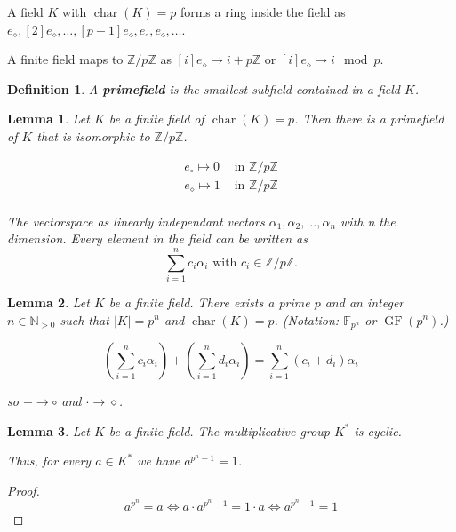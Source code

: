 \documentclass{article}
\newtheorem{definition}{Definition}
\newtheorem{lemma}{Lemma}
\newcommand{\ZZ}{\mathbb{Z}}
\newcommand{\NN}{\mathbb{N}}
\newcommand{\FF}{\mathbb{F}}
\newcommand{\GF}{\operatorname{GF}}
\newcommand{\mchar}{\operatorname{char}}
\begin{document}
A field $K$ with $\mchar(K) = p$ forms a ring inside the field as
$e_\diamond, [2]e_\diamond, \dots, [p-1] e_\diamond, e_\circ, e_\diamond, \dots$.

A finite field maps to $\ZZ/p\ZZ$ as $[i] e_\diamond \mapsto i + p\ZZ$ or $[i]
e_\diamond \mapsto i \mod p$.

\begin{definition}
    A \textbf{primefield} is the smallest subfield contained in a field $K$.
\end{definition}

\begin{lemma}
    Let $K$ be a finite field of $\mchar(K) = p$. Then there is a primefield of
    $K$ that is isomorphic to $\ZZ/p\ZZ$.

    \begin{align*}
        e_\circ \mapsto 0 & \text{ in $\ZZ/p\ZZ$} \\
        e_\diamond \mapsto 1 & \text{ in $\ZZ/p\ZZ$} \\
    \end{align*}

    The vectorspace as linearly independant vectors $\alpha_1, \alpha_2, \dots,
    \alpha_n$ with n the dimension. Every element in the field can be written as
    \[ \sum^n_{i=1} c_i \alpha_i \text{ with } c_i \in \ZZ/p\ZZ.\]

\end{lemma}


\begin{lemma}
    Let $K$ be a finite field. There exists a prime $p$ and an integer $n \in \NN_{>0}$ such
    that $|K| = p^n$ and $\mchar(K) = p$. (\emph{Notation:} $\FF_{p^n}$ or $\GF(p^n)$.)

    \[ \left(\sum_{i=1}^n c_i \alpha_i\right) + \left(\sum_{i=1}^n d_i \alpha_i\right)
        = \sum_{i=1}^n (c_i + d_i)\alpha_i \]

    so $+ \to \circ$ and $\cdot \to \diamond$.

\end{lemma}

\begin{lemma}
    Let $K$ be a finite field. The multiplicative group $K^*$ is cyclic.

    Thus, for every $a \in K^*$ we have $a^{p^{n}-1} = 1$.
\end{lemma}
\begin{proof}
    \[ a^{p^n} = a \Leftrightarrow a \cdot a^{p^{n}-1} = 1 \cdot a \Leftrightarrow a^{p^{n}-1} = 1 \]
\end{proof}
\end{document}
